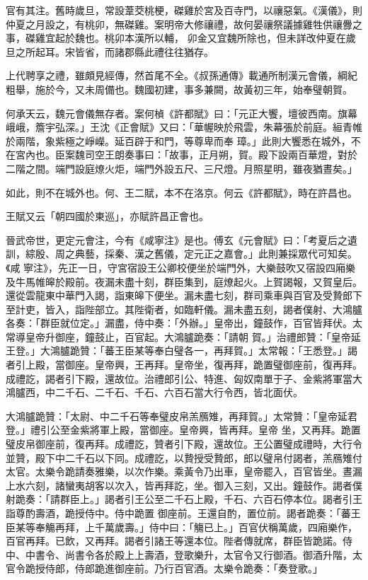 \begin{pinyinscope}
 官有其注。舊時歲旦，常設葦茭桃梗，磔雞於宮及百寺門，以禳惡氣。《漢儀》，則仲夏之月設之，有桃卯，無磔雞。案明帝大修禳禮，故何晏禳祭議據雞牲供禳釁之事，磔雞宜起於魏也。桃卯本漢所以輔，
 卯金又宜魏所除也，但未詳改仲夏在歲旦之所起耳。宋皆省，而諸郡縣此禮往往猶存。



 上代聘享之禮，雖頗見經傳，然首尾不全。《叔孫通傳》載通所制漢元會儀，綱紀粗舉，施於今，又未周備也。魏國初建，事多兼闕，故黃初三年，始奉璧朝賀。



 何承天云，魏元會儀無存者。案何楨《許都賦》曰：「元正大饗，壇彼西南。旗幕峨峨，簷宇弘深。」王沈《正會賦》又曰：「華幄映於飛雲，朱幕張於前庭。絙青帷於兩階，象紫極之崢嶸。延百辟于和門，等尊卑而奉
 璋。」此則大饗悉在城外，不在宮內也。臣案魏司空王朗奏事曰：「故事，正月朔，賀。殿下設兩百華燈，對於二階之間。端門設庭燎火炬，端門外設五尺、三尺燈。月照星明，雖夜猶晝矣。」



 如此，則不在城外也。何、王二賦，本不在洛京。何云《許都賦》，時在許昌也。



 王賦又云「朝四國於東巡」，亦賦許昌正會也。



 晉武帝世，更定元會注，今有《咸寧注》是也。傅玄《元會賦》曰：「考夏后之遺訓，綜殷、周之典藝，採秦、漢之舊儀，定元正之嘉會。」此則兼採眾代可知矣。《咸
 寧注》，先正一日，守宮宿設王公卿校便坐於端門外，大樂鼓吹又宿設四廂樂及牛馬帷皞於殿前。夜漏未盡十刻，群臣集到，庭燎起火。上賀謁報，又賀皇后。還從雲龍東中華門入謁，詣東皞下便坐。漏未盡七刻，群司乘車與百官及受贄郎下至計吏，皆入，詣陛部立。其陛衛者，如臨軒儀。漏未盡五刻，謁者僕射、大鴻臚各奏：「群臣就位定。」漏盡，侍中奏：「外辦。」皇帝出，鐘鼓作，百官皆拜伏。太常導皇帝升御座，鐘鼓止，百官起。大鴻臚跪奏：「請朝
 賀。」治禮郎贊：「皇帝延王登。」大鴻臚跪贊：「蕃王臣某等奉白璧各一，再拜賀。」太常報：「王悉登。」謁者引上殿，當御座。皇帝興，王再拜。皇帝坐，復再拜，跪置璧御座前，復再拜。成禮訖，謁者引下殿，還故位。治禮郎引公、特進、匈奴南單于子、金紫將軍當大鴻臚西，中二千石、二千石、千石、六百石當大行令西，皆北面伏。



 大鴻臚跪贊：「太尉、中二千石等奉璧皮帛羔鴈雉，再拜賀。」太常贊：「皇帝延君登。」禮引公至金紫將軍上殿，當御座。皇帝興，皆再拜。皇帝
 坐，又再拜。跪置璧皮帛御座前，復再拜。成禮訖，贊者引下殿，還故位。王公置璧成禮時，大行令並贊，殿下中二千石以下同。成禮訖，以贄授受贄郎，郎以璧帛付謁者，羔鴈雉付太官。太樂令跪請奏雅樂，以次作樂。乘黃令乃出車，皇帝罷入，百官皆坐。晝漏上水六刻，諸蠻夷胡客以次入，皆再拜訖，坐。御入三刻，又出。鐘鼓作。謁者僕射跪奏：「請群臣上。」謁者引王公至二千石上殿，千石、六百石停本位。謁者引王詣尊酌壽酒，跪授侍中。侍中跪置
 御座前。王還自酌，置位前。謁者跪奏：「蕃王臣某等奉觴再拜，上千萬歲壽。」侍中曰：「觴已上。」百官伏稱萬歲，四廂樂作，百官再拜。已飲，又再拜。謁者引諸王等還本位。陛者傳就席，群臣皆跪諾。侍中、中書令、尚書令各於殿上上壽酒，登歌樂升，太官令又行御酒。御酒升階，太官令跪授侍郎，侍郎跪進御座前。乃行百官酒。太樂令跪奏：「奏登歌。」




\end{pinyinscope}
